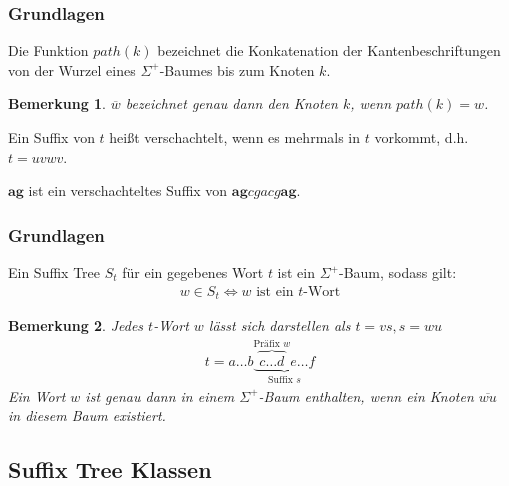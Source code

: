 \documentclass{beamer}
\newtheorem{remark}{Bemerkung}
\begin{document}
\begin{frame}
\frametitle{Grundlagen}
\begin{definition}[Pfad]
Die Funktion $path(k)$ bezeichnet die Konkatenation der Kantenbeschriftungen von der Wurzel eines $\Sigma^+$-Baumes bis zum Knoten $k$.
\begin{remark}
$\overline{w}$ bezeichnet genau dann den Knoten $k$, wenn $path(k) = w$.
\end{remark}
\end{definition}
\begin{definition}
Ein Suffix von $t$ heißt verschachtelt, wenn es mehrmals in $t$ vorkommt, d.h. $t = uvwv$.
\end{definition}
\begin{example}
$\boldsymbol{ag}$ ist ein verschachteltes Suffix von $\boldsymbol{ag}cgacg\boldsymbol{ag}$.
\end{example}
\end{frame}

\begin{frame}
\frametitle{Grundlagen}
\begin{definition}
Ein Suffix Tree $S_t$ für ein gegebenes Wort $t$ ist ein $\Sigma^+$-Baum, sodass gilt:
\begin{gather*}
    w \in S_t  \Longleftrightarrow w \text{ ist ein }t\text{-Wort}
\end{gather*}
\end{definition}
\begin{remark}
Jedes $t$-Wort $w$ lässt sich darstellen als $t = vs, s = wu$
\begin{gather*}
    t = a \dots b \underbrace{\overbrace{c \dots d}^{\text{Präfix }w} e \dots f}_{\text{Suffix }s}
\end{gather*}
Ein Wort $w$ ist genau dann in einem $\Sigma^+$-Baum enthalten, wenn ein Knoten $\overline{wu}$ in diesem Baum existiert.
\end{remark}
\end{frame}

\subsection{Suffix Tree Klassen}
\end{document}
